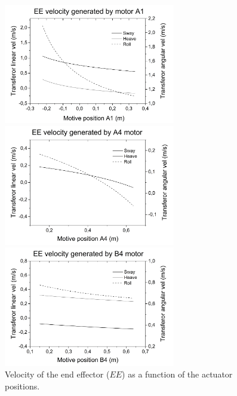 \documentclass[10.5pt, twocolumn]{article}
\begin{document}
\begin{figure}
\centering
\begin{minipage}{0.49\textwidth}
	\includegraphics[width=7.5cm]{Images/EE_vel_A1}
\end{minipage}
\begin{minipage}{0.49\textwidth}
	\includegraphics[width=7.5cm]{Images/EE_vel_A4}
\end{minipage}
\begin{minipage}{0.49\textwidth}
	\includegraphics[width=7.5cm]{Images/EE_vel_B4}
\end{minipage}
    \caption{Velocity of the end effector (\( EE \)) as a function of the actuator positions.}
     \label{fig:vel}
\end{figure}
\end{document}

